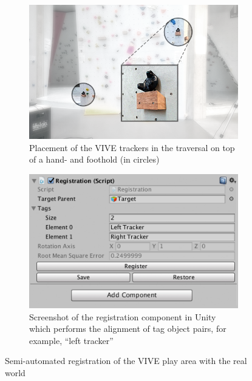\begin{figure}[ht]
	\centering
	\begin{subfigure}[t]{0.49\columnwidth}
		\centering
		\includegraphics[width=\textwidth]{include/images/registration-trackers.png}
		\caption{Placement of the VIVE trackers in the traversal on top of a hand- and foothold (in circles)}
		\label{fig:registration-trackers}
	\end{subfigure}
	\hspace*{\fill}
	\begin{subfigure}[t]{0.49\columnwidth}
		\centering
		\includegraphics[width=\textwidth]{include/images/registration-unity.png}
		\caption{Screenshot of the registration component in Unity which performs the alignment of tag object pairs, for example, “left tracker”}
		\label{fig:registration-unity}
	\end{subfigure}
	\caption[VIVE play area registration]{Semi-automated registration of the VIVE play area with the real world}
	\label{fig:registration}
\end{figure}